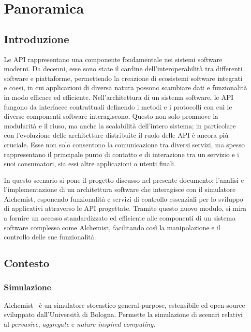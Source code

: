 \chapter{Panoramica}\label{chap:introduction}
\section{Introduzione}\label{sec:background}
Le \ac{API} rappresentano una componente fondamentale nei sistemi software moderni. Da decenni, esse sono state il cardine dell'interoperabilità tra differenti software e piattaforme, permettendo la
creazione di ecosistemi software integrati e coesi, in cui applicazioni di diversa natura possono scambiare dati e funzionalità in modo efficace ed efficiente.
Nell'architettura di un sistema software, le \ac{API} fungono da interfacce contrattuali definendo i metodi e i protocolli con cui le diverse componenti software interagiscono. Questo non solo 
promuove la modularità e il riuso, ma anche la scalabilità dell'intero sistema; in particolare con l'evoluzione delle architetture distribuite il ruolo delle \ac{API} è ancora più cruciale.
Esse non solo consentono la comunicazione tra diversi servizi, ma spesso rappresentano il principale punto di contatto e di interazione tra un servizio e i suoi consumatori, sia essi altre applicazioni
o utenti finali.

In questo scenario si pone il progetto discusso nel presente documento: l'analisi e l'implementazione di un architettura software che interagisce con il simulatore Alchemist, esponendo funzionalità e
servizi di controllo essenziali per lo sviluppo di applicativi attraverso le API progettate.
Tramite questo nuovo modulo, si mira a fornire un accesso standardizzato ed efficiente alle componenti di un sistema software complesso come Alchemist, facilitando così la manipolazione e il controllo
delle sue funzionalità.

\section{Contesto}\label{sec:context}
\subsection{Simulazione}\label{ssec:alchemist}
Alchemist~\cite{alchemist} è un simulatore stocastico general-purpose, estensibile ed open-source sviluppato dall'Università di Bologna. Permette la simulazione di scenari relativi al
\textit{pervasive}, \textit{aggregate} e \textit{nature-inspired computing}.

